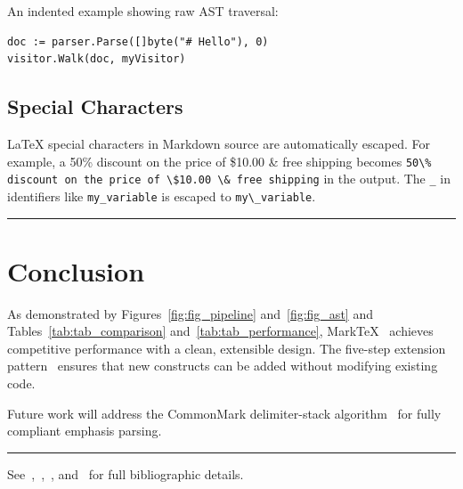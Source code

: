 \documentclass{article}
\begin{document}
An indented example showing raw AST traversal:

\begin{verbatim}
doc := parser.Parse([]byte("# Hello"), 0)
visitor.Walk(doc, myVisitor)
\end{verbatim}

\subsection{Special Characters}

LaTeX special characters in Markdown source are automatically escaped. For example, a 50\% discount on the price of \$10.00 \& free shipping becomes \texttt{50\textbackslash{}\% discount on the price of \textbackslash{}\$10.00 \textbackslash{}\& free shipping} in the output. The \texttt{\_} in identifiers like \texttt{my\_variable} is escaped to \texttt{my\textbackslash{}\_variable}.


\noindent\rule{\linewidth}{0.4pt}

\section{Conclusion}

As demonstrated by Figures~\ref{fig:fig_pipeline} and~\ref{fig:fig_ast} and Tables~\ref{tab:tab_comparison} and~\ref{tab:tab_performance}, MarkTeX~\cite{gruber2004markdown} achieves competitive performance with a clean, extensible design. The five-step extension pattern~\cite{commonmark2021spec} ensures that new constructs can be added without modifying existing code.

Future work will address the CommonMark delimiter-stack algorithm~\cite{commonmark2021spec} for fully compliant emphasis parsing.


\noindent\rule{\linewidth}{0.4pt}

See~\cite{knuth1986texbook},~\cite{lamport1994latex},~\cite{gruber2004markdown}, and~\cite{commonmark2021spec} for full bibliographic details.
\end{document}
